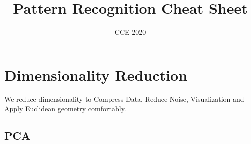 \documentclass{article}
\title{Pattern Recognition Cheat Sheet}
\author{CCE 2020}
\begin{document}
\maketitle
\tableofcontents
\section{Dimensionality Reduction}
We reduce dimensionality to Compress Data, Reduce Noise, 
Visualization and Apply Euclidean geometry comfortably.
\subsection{PCA}
\end{document}
